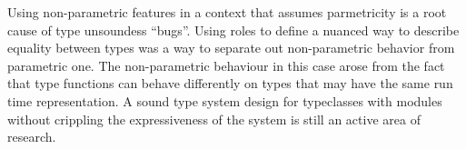 \documentclass[manuscript,screen,nonacm]{acmart}
\begin{document}
Using non-parametric features in a context that assumes parmetricity is a root cause of type unsoundess ``bugs''.
Using roles to define a nuanced way to describe equality between types was a way to separate out non-parametric behavior from parametric one. The non-parametric behaviour in this case arose from the fact that type functions can behave differently on types that may have the same run time representation.
A sound type system design for typeclasses with modules without crippling the expressiveness of the system is still an active area of research.


\end{document}
